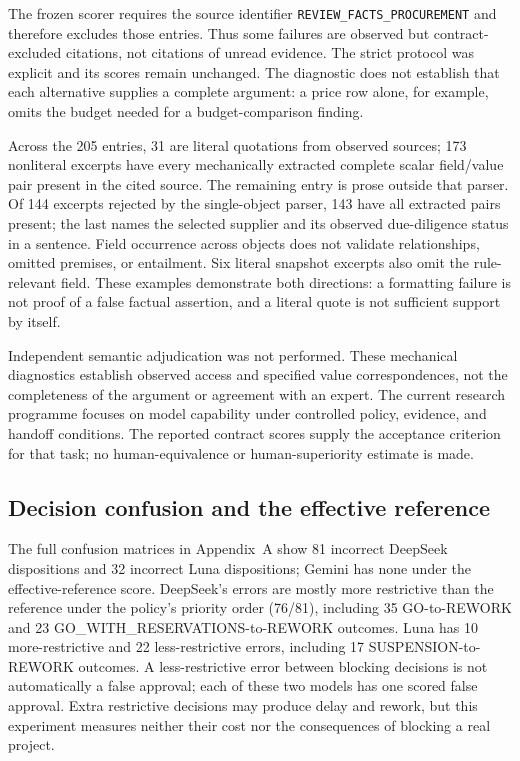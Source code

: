 The frozen scorer requires the source identifier
\texttt{REVIEW\_FACTS\_PROCUREMENT} and therefore excludes those entries. Thus some failures are observed but contract-excluded
citations, not citations of unread evidence. The strict protocol was explicit and its scores
remain unchanged. The diagnostic does not establish that each alternative supplies a complete
argument: a price row alone, for example, omits the budget needed for a budget-comparison finding.

Across the 205 entries, 31 are literal quotations from observed sources; 173 nonliteral excerpts
have every mechanically extracted complete scalar field/value pair present in the cited source.
The remaining entry is prose outside that parser. Of 144 excerpts rejected by the single-object
parser, 143 have all extracted pairs present; the last names the selected supplier and its
observed due-diligence status in a sentence. Field occurrence across objects does not validate
relationships, omitted premises, or entailment. Six literal snapshot excerpts also omit the
rule-relevant field. These examples demonstrate both directions: a formatting failure is not
proof of a false factual assertion, and a literal quote is not sufficient support by itself.

Independent semantic adjudication was not performed. These mechanical diagnostics establish
observed access and specified value correspondences, not the completeness of the argument or
agreement with an expert. The current research programme focuses on model capability under
controlled policy, evidence, and handoff conditions. The reported contract scores supply the
acceptance criterion for that task; no human-equivalence or human-superiority estimate is made.

\subsection{Decision confusion and the effective reference}

The full confusion matrices in Appendix~A show 81 incorrect DeepSeek dispositions and 32
incorrect Luna dispositions; Gemini has none under the effective-reference score. DeepSeek's
errors are mostly more restrictive than the reference under the policy's priority order
(76/81), including 35 GO-to-REWORK and 23 GO\_WITH\_RESERVATIONS-to-REWORK outcomes. Luna has
10 more-restrictive and 22 less-restrictive errors, including 17 SUSPENSION-to-REWORK outcomes.
A less-restrictive error between blocking decisions is not automatically a false approval;
each of these two models has one scored false approval. Extra restrictive decisions may
produce delay and rework, but this experiment measures neither their cost nor the consequences
of blocking a real project.

